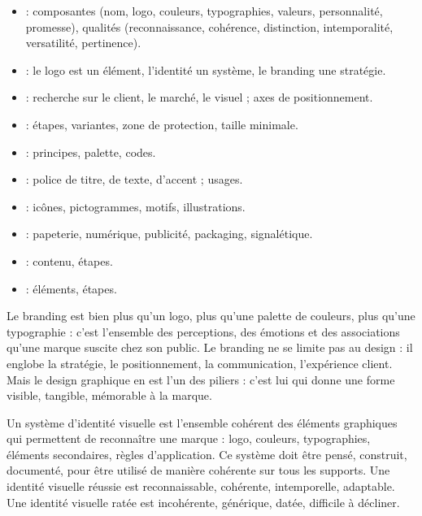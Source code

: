 \begin{itemize}
    \item {} : composantes (nom, logo, couleurs, typographies, valeurs, personnalité, promesse), qualités (reconnaissance, cohérence, distinction, intemporalité, versatilité, pertinence).
    \item {} : le logo est un élément, l'identité un système, le branding une stratégie.
    \item {} : recherche sur le client, le marché, le visuel ; axes de positionnement.
    \item {} : étapes, variantes, zone de protection, taille minimale.
    \item {} : principes, palette, codes.
    \item {} : police de titre, de texte, d'accent ; usages.
    \item {} : icônes, pictogrammes, motifs, illustrations.
    \item {} : papeterie, numérique, publicité, packaging, signalétique.
    \item {} : contenu, étapes.
    \item {} : éléments, étapes.
\end{itemize}

Le branding est bien plus qu'un logo, plus qu'une palette de couleurs, plus qu'une typographie : c'est l'ensemble des perceptions, des émotions et des associations qu'une marque suscite chez son public. Le branding ne se limite pas au design : il englobe la stratégie, le positionnement, la communication, l'expérience client. Mais le design graphique en est l'un des piliers : c'est lui qui donne une forme visible, tangible, mémorable à la marque.

Un système d'identité visuelle est l'ensemble cohérent des éléments graphiques qui permettent de reconnaître une marque : logo, couleurs, typographies, éléments secondaires, règles d'application. Ce système doit être pensé, construit, documenté, pour être utilisé de manière cohérente sur tous les supports. Une identité visuelle réussie est reconnaissable, cohérente, intemporelle, adaptable. Une identité visuelle ratée est incohérente, générique, datée, difficile à décliner.


